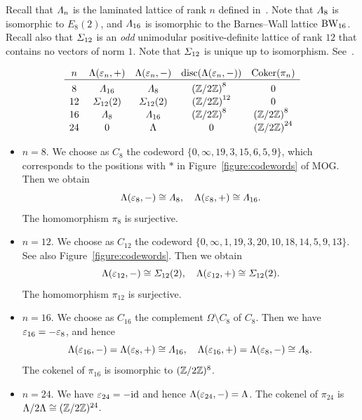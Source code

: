 \documentclass{amsart} %
\begin{document}
 Recall that $\varLambda_{n}$ is 
 the laminated lattice of rank $n$
 defined in~\cite[Figure 6.2]{theCSbook}.
 Note that $\varLambda_8$
is isomorphic to $E_8(2)$,
and $\varLambda_{16}$ is 
isomorphic to the Barnes--Wall lattice $\mathrm{BW}_{16}$.
 Recall also that
$\varSigma_{12}$ is an \emph{odd} unimodular positive-definite lattice of rank $12$
that contains no vectors of norm $1$.
Note that $\varSigma_{12}$ is unique up to isomorphism.
See~\cite[Table 16.7]{theCSbook}.
%
\begin{table}
\[
\begin{array}{ccccc}
n & \Leech(\vep_n, +)& \Leech(\vep_n, -) & \disc(\Leech(\vep_n, -)) & \Coker (\pi_n) \\
\hline
8 & \Lamsxtn & \Laminated_{8} & {(\ZZ/2\ZZ)}^{8\;\;} & 0 \mystruth{12pt}\\
12 & \Sigmatwlv(2) & \Sigmatwlv(2) & {(\ZZ/2\ZZ)}^{12} & 0 \\
16 & \Laminated_{8} & \Lamsxtn & {(\ZZ/2\ZZ)}^{8\;\;} &{(\ZZ/2\ZZ)}^{8\;\;} \\
24& 0 & \Leech &0 &{(\ZZ/2\ZZ)}^{24} \\
\end{array}
\]
\caption{$\Leech(\vep_n, +)$ and $\Leech(\vep_n, -)$}\label{table:minuspart}
\end{table}
%
\begin{itemize}
%
\item $n=8$. 
We choose as $C_{8}$ the codeword 
$\{ 0,\infty, 19, 3, 15, 6, 5, 9\} $, 
which corresponds to 
the positions with $*$ in Figure~\ref{figure:codewords} of MOG.
Then we obtain 
\[
\Lambda(\varepsilon_8, -)\cong \varLambda_{8},
\quad 
\Lambda(\varepsilon_8, +)\cong \varLambda_{16}.
\]
The homomorphism $\pi_{8}$ is surjective.
%
\item $n=12$. 
We choose as $C_{12}$ the codeword 
$\{ 0,\infty, 1,19, 3, 20,10, 18, 14, 5, 9, 13\}$.
See also Figure~\ref{figure:codewords}.
Then we obtain 
\[
\Lambda(\varepsilon_{12}, -)\cong \varSigma_{12}(2),
\quad 
\Lambda(\varepsilon_{12}, +)\cong \varSigma_{12}(2).
\]
The homomorphism $\pi_{12}$ is surjective.
%
\item $n=16$. 
We choose as $C_{16}$ the complement $\Omega\setminus C_8$ of $C_8$. 
Then we have $\varepsilon_{16}=-\varepsilon_{8}$, and hence 
\[
\Lambda(\varepsilon_{16}, -)=\Lambda(\varepsilon_{8}, +)\cong \varLambda_{16},
\quad 
\Lambda(\varepsilon_{16}, +)=\Lambda(\varepsilon_8, -)\cong \varLambda_{8}.
\]
%
The cokenel of $\pi_{16}$ is isomorphic to $(\mathord{\mathbb{Z}}/2\mathord{\mathbb{Z}})^8$.
%
\item $n=24$. We have $\varepsilon_{24}=-\mathord{\mathrm{id}}$ and hence 
$\Lambda(\varepsilon_{24}, -)=\Lambda$.
The cokenel of $\pi_{24}$ is $\Lambda/2\Lambda \cong (\mathord{\mathbb{Z}}/2\mathord{\mathbb{Z}})^{24}$.
\end{itemize}
\end{document}

